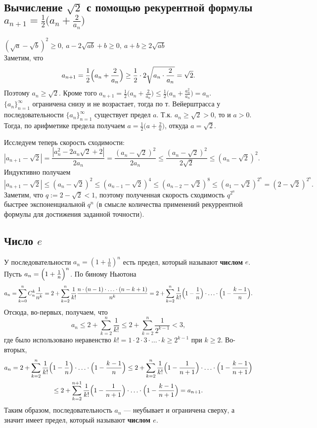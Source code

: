 \documentclass[12pt]{article}
\theoremstyle{definition}
\begin{document}
\subsection{Вычисление $\sqrt{2}$ с помощью рекурентной формулы $a_{n+1}=\frac{1}{2}\bigl(a_n + \frac{2}{a_n}\bigr)$}
{\rm 
$(\sqrt{a} - \sqrt{b})^2 \geq 0, \  a - 2\sqrt{ab} + b \geq 0, \ a + b \geq 2\sqrt{ab}$ \\ 
Заметим, что 
$$
a_{n+1}=\frac{1}{2}\Bigl(a_n + \frac{2}{a_n}\Bigr)\ge \frac{1}{2}\cdot 2\sqrt{a_n\cdot\frac{2}{a_n}}=\sqrt2.
$$
Поэтому $a_n\ge\sqrt 2$.
Кроме того
$
a_{n+1}=\frac{1}{2}\bigl(a_n + \frac{2}{a_n}\bigr) \le \frac{1}{2}\bigl(a_n + \frac{a_n^2}{a_n}\bigr)=a_n.
$ \\ 
$\{a_n\}_{n=1}^\infty$ ограничена снизу и не возрастает, тогда по т. Вейерштрасса у последовательности $\{a_n\}_{n=1}^\infty$
существует предел $a$. Т.к. $a_n\ge \sqrt2>0$, то и $a> 0$.
Тогда, по арифметике предела получаем
$a =\frac{1}{2}\bigl(a + \frac{2}{a}\bigr)$, откуда $a=\sqrt2$.

Исследуем теперь скорость сходимости:
$$
|a_{n+1} - \sqrt2| = \frac{|a_n^2 - 2 a_n\sqrt2 +2|}{2a_n}
=
\frac{(a_n - \sqrt2)^2}{2a_n}
\le
\frac{(a_n - \sqrt2)^2}{2\sqrt2}\le (a_n - \sqrt2)^2.
$$
Индуктивно получаем
$$
|a_{n+1} - \sqrt2| \le (a_n - \sqrt2)^2 \le (a_{n-1} - \sqrt2)^4
\le (a_{n-2} - \sqrt2)^8\le (a_1 - \sqrt2)^{2^{n}} = (2 - \sqrt2)^{2^{n}}.
$$
Заметим, что $q:=2-\sqrt2 <1$, поэтому полученная скорость сходимость $q^{2^n}$
быстрее экспоненциальной $q^n$
(в смысле количества применений рекуррентной формулы для достижения заданной точности).
}
\subsection{Число $e$}
У последовательности $a_n = \left(1+\frac{1}{n}\right)^n$ есть предел, который называют \textbf{числом} $e$. \\ 
Пусть $a_n = \Bigl(1+\frac{1}{n}\Bigr)^{n}$.
По биному Ньютона
$$
a_n = \sum_{k=0}^{n}C_n^k \frac{1}{n^k}
= 2+\sum_{k=2}^{n}\frac{1}{k!}\frac{n\cdot (n-1)\cdot\ldots\cdot (n-k+1)}{n^k}
=2+\sum_{k=2}^{n}\frac{1}{k!}\Bigl(1-\frac{1}{n}\Bigr)\cdot\ldots\cdot\Bigl(1-\frac{k-1}{n}\Bigr).
$$
Отсюда, во-первых, получаем, что
$$
a_n\le2+\sum_{k=2}^{n}\frac{1}{k!}\le 2+\sum_{k=2}^{n}\frac{1}{2^{k-1}}< 3,
$$
где было использовано неравенство $k! = 1\cdot2\cdot3\cdot\ldots\cdot k \ge 2^{k-1}$
при $k\ge 2$.
Во-вторых,
\begin{multline*}
a_n=2+\sum_{k=2}^{n}\frac{1}{k!}\Bigl(1-\frac{1}{n}\Bigr)\cdot\ldots\cdot\Bigl(1-\frac{k-1}{n}\Bigr)
\le
2+\sum_{k=2}^{n}\frac{1}{k!}\Bigl(1-\frac{1}{n+1}\Bigr)\cdot\ldots\cdot\Bigl(1-\frac{k-1}{n+1}\Bigr)
\\
\le
2+\sum_{k=2}^{n+1}\frac{1}{k!}\Bigl(1-\frac{1}{n+1}\Bigr)\cdot\ldots\cdot\Bigl(1-\frac{k-1}{n+1}\Bigr)=a_{n+1}.
\end{multline*}
Таким образом, последовательность $a_n$ --- неубывает и ограничена сверху, а значит имеет предел,
который называют {\bf числом $e$}.
\end{document}
